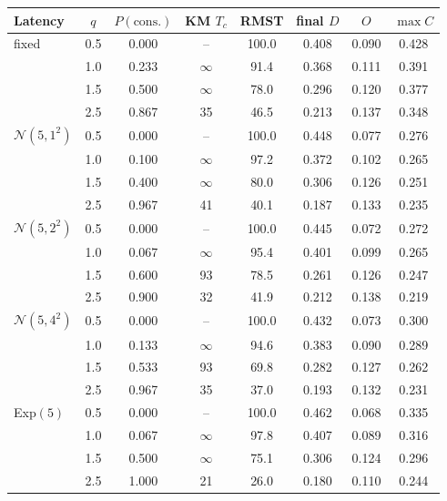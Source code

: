 \begin{tabular}{@{}lccccccc@{}}
\toprule
Latency & $q$ & $P(\mathrm{cons.})$ & KM $T_c$ & RMST & final $D$ & $O$ & $\max C$ \\
\midrule
fixed & 0.5 & 0.000 & -- & 100.0 & 0.408 & 0.090 & 0.428 \\
 & 1.0 & 0.233 & $\infty$ & 91.4 & 0.368 & 0.111 & 0.391 \\
 & 1.5 & 0.500 & $\infty$ & 78.0 & 0.296 & 0.120 & 0.377 \\
 & 2.5 & 0.867 & 35 & 46.5 & 0.213 & 0.137 & 0.348 \\
\midrule
$\mathcal{N}(5,1^2)$ & 0.5 & 0.000 & -- & 100.0 & 0.448 & 0.077 & 0.276 \\
 & 1.0 & 0.100 & $\infty$ & 97.2 & 0.372 & 0.102 & 0.265 \\
 & 1.5 & 0.400 & $\infty$ & 80.0 & 0.306 & 0.126 & 0.251 \\
 & 2.5 & 0.967 & 41 & 40.1 & 0.187 & 0.133 & 0.235 \\
\midrule
$\mathcal{N}(5,2^2)$ & 0.5 & 0.000 & -- & 100.0 & 0.445 & 0.072 & 0.272 \\
 & 1.0 & 0.067 & $\infty$ & 95.4 & 0.401 & 0.099 & 0.265 \\
 & 1.5 & 0.600 & 93 & 78.5 & 0.261 & 0.126 & 0.247 \\
 & 2.5 & 0.900 & 32 & 41.9 & 0.212 & 0.138 & 0.219 \\
\midrule
$\mathcal{N}(5,4^2)$ & 0.5 & 0.000 & -- & 100.0 & 0.432 & 0.073 & 0.300 \\
 & 1.0 & 0.133 & $\infty$ & 94.6 & 0.383 & 0.090 & 0.289 \\
 & 1.5 & 0.533 & 93 & 69.8 & 0.282 & 0.127 & 0.262 \\
 & 2.5 & 0.967 & 35 & 37.0 & 0.193 & 0.132 & 0.231 \\
\midrule
Exp$(5)$ & 0.5 & 0.000 & -- & 100.0 & 0.462 & 0.068 & 0.335 \\
 & 1.0 & 0.067 & $\infty$ & 97.8 & 0.407 & 0.089 & 0.316 \\
 & 1.5 & 0.500 & $\infty$ & 75.1 & 0.306 & 0.124 & 0.296 \\
 & 2.5 & 1.000 & 21 & 26.0 & 0.180 & 0.110 & 0.244 \\
\bottomrule
\end{tabular}

